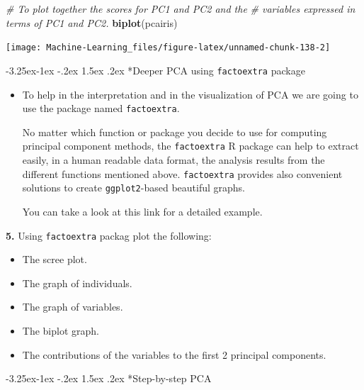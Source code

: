 \documentclass[]{book}
\makeatletter
\newenvironment{Shaded}{\begin{snugshade}}{\end{snugshade}}
\newcommand{\KeywordTok}[1]{\textcolor[rgb]{0.13,0.29,0.53}{\textbf{#1}}}
\newcommand{\CommentTok}[1]{\textcolor[rgb]{0.56,0.35,0.01}{\textit{#1}}}
\newcommand{\NormalTok}[1]{#1}
\providecommand{\tightlist}{%
  \setlength{\itemsep}{0pt}\setlength{\parskip}{0pt}}
\newenvironment{rmdblock}[1]
  {\begin{shaded*}
  \begin{itemize}
  \renewcommand{\labelitemi}{
    \raisebox{-.7\height}[0pt][0pt]{
      {\setkeys{Gin}{width=2em,keepaspectratio}\texttt{[image: img/icons/\#1]}}
    }
  }
  \item
  }
  {
  \end{itemize}
  \end{shaded*}
  }
\newenvironment{rmdinsight}
  {\begin{rmdblock}{insight}}
  {\end{rmdblock}}
\renewcommand\subsection{\@startsection{subsection}{2}{\z@}%
                                     {-3.25ex\@plus -1ex \@minus -.2ex}%
                                     {1.5ex \@plus .2ex}%
                                     {\normalfont\large\bfseries\color{Violet}}}
\theoremstyle{definition}
\theoremstyle{definition}
\theoremstyle{definition}
\theoremstyle{remark}
\makeatother
\begin{document}
\begin{Shaded}
\begin{Highlighting}[]

\CommentTok{# To plot together the scores for PC1 and PC2 and the }
\CommentTok{# variables expressed in terms of PC1 and PC2.}
\KeywordTok{biplot}\NormalTok{(pcairis) }
\end{Highlighting}
\end{Shaded}

\begin{center}\texttt{[image: Machine-Learning\_files/figure-latex/unnamed-chunk-138-2]} \end{center}

\subsection*{\texorpdfstring{Deeper PCA using \texttt{factoextra}
package}{Deeper PCA using factoextra package}}\label{deeper-pca-using-factoextra-package}

\begin{rmdinsight}
To help in the interpretation and in the visualization of PCA we are
going to use the package named \texttt{factoextra}.

No matter which function or package you decide to use for computing
principal component methods, the \texttt{factoextra} R package can help
to extract easily, in a human readable data format, the analysis results
from the different functions mentioned above. \texttt{factoextra}
provides also convenient solutions to create \texttt{ggplot2}-based
beautiful graphs.

You can take a look at this link for a detailed example.
\end{rmdinsight}

\textbf{5.} Using \texttt{factoextra} packag plot the following:

\begin{itemize}
\tightlist
\item
  The scree plot.
\item
  The graph of individuals.
\item
  The graph of variables.
\item
  The biplot graph.
\item
  The contributions of the variables to the first 2 principal
  components.
\end{itemize}

\subsection*{Step-by-step PCA}\label{step-by-step-pca}
\end{document}
